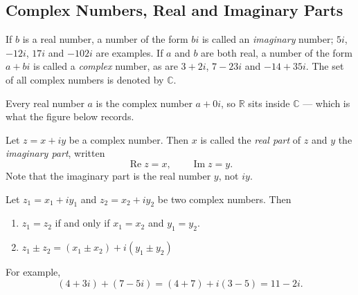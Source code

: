 \documentclass[11pt,a4paper]{article}
\theoremstyle{definition}
\begin{document}
\subsection{Complex Numbers, Real and Imaginary Parts}
If $b$ is a real number, a number of the form $bi$ is called an \emph{imaginary}
number; $5i$, $-12i$, $17i$ and $-102i$ are examples. If $a$ and $b$ are both
real, a number of the form $a+bi$ is called a \emph{complex} number, as are
$3+2i$, $7-23i$ and $-14+35i$. The set of all complex numbers is denoted by
$\mathbb{C}$.

Every real number $a$ is the complex number $a+0i$, so $\mathbb{R}$ sits inside
$\mathbb{C}$ --- which is what the figure below records.

\begin{figure}[H]
\centering
{}
\end{figure}





Let $z=x+iy$ be a complex number. Then $x$ is called the \emph{real part} of
$z$ and $y$ the \emph{imaginary part}, written
$$\operatorname{Re}z=x,\qquad \operatorname{Im}z=y .$$
Note that the imaginary part is the real number $y$, not $iy$.

Let $z_1=x_1+iy_1$ and $z_2=x_2+iy_2$ be two complex numbers. Then
\begin{enumerate}
\item $z_1=z_2$ if and only if $x_1=x_2$ and $y_1=y_2$.

\item $z_1\pm z_2 = (x_1\pm x_2)+i(y_1\pm y_2)$\\
\end{enumerate}

For example,
$$(4+3i)+(7-5i)=(4+7)+i(3-5)=11-2i .$$
\end{document}
